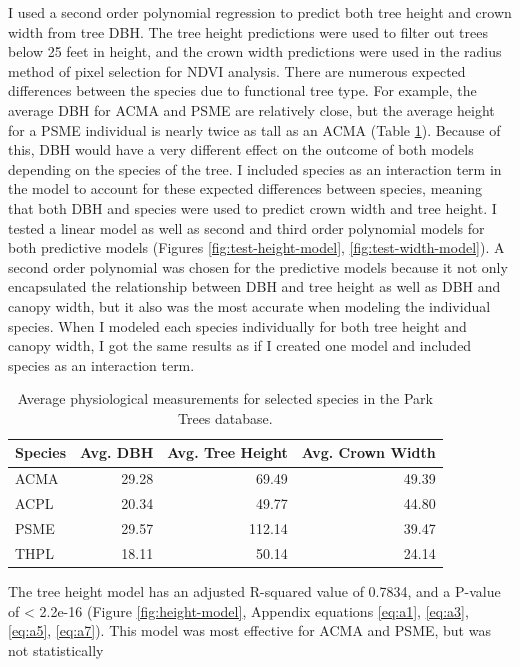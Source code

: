 \documentclass[12pt,twoside]{reedthesis}
\begin{document}
I used a second order polynomial regression to predict both tree height
and crown width from tree DBH. The tree height predictions were used to
filter out trees below 25 feet in height, and the crown width
predictions were used in the radius method of pixel selection for NDVI
analysis. There are numerous expected differences between the species
due to functional tree type. For example, the average DBH for ACMA and
PSME are relatively close, but the average height for a PSME individual
is nearly twice as tall as an ACMA (Table \ref{tab:tree-stats-table}).
Because of this, DBH would have a very different effect on the outcome
of both models depending on the species of the tree. I included species
as an interaction term in the model to account for these expected
differences between species, meaning that both DBH and species were used
to predict crown width and tree height. I tested a linear model as well
as second and third order polynomial models for both predictive models
(Figures \ref{fig:test-height-model}, \ref{fig:test-width-model}). A
second order polynomial was chosen for the predictive models because it
not only encapsulated the relationship between DBH and tree height as
well as DBH and canopy width, but it also was the most accurate when
modeling the individual species. When I modeled each species
individually for both tree height and canopy width, I got the same
results as if I created one model and included species as an interaction
term.
\begin{table}[H]

\caption[Physiological Tree Measurements]{\label{tab:tree-stats-table}Average physiological measurements for selected species in the Park Trees database.}
\centering
\begin{tabular}[t]{lrrr}
\toprule
Species & Avg. DBH & Avg. Tree Height & Avg. Crown Width\\
\midrule
ACMA & 29.28 & 69.49 & 49.39\\
ACPL & 20.34 & 49.77 & 44.80\\
PSME & 29.57 & 112.14 & 39.47\\
THPL & 18.11 & 50.14 & 24.14\\
\bottomrule
\end{tabular}
\end{table}
The tree height model has an adjusted R-squared value of 0.7834, and a
P-value of \textless{} 2.2e-16 (Figure \ref{fig:height-model}, Appendix
equations \eqref{eq:a1}, \eqref{eq:a3}, \eqref{eq:a5}, \eqref{eq:a7}). This
model was most effective for ACMA and PSME, but was not statistically
\end{document}
